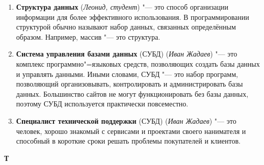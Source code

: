 \begin{enumerate}
     \item \textbf{Структура данных} (\textit{Леонид, студент}) "--- 
     это способ организации информации для более эффективного использования. В программировании структурой обычно называют набор данных, связанных определённым образом. Например, массив "--- это структура.

     \item \textbf{Система управления базами данных} (СУБД) (\textit{Иван Жадаев}) "--- 
     это комплекс программно"=языковых средств, позволяющих создать базы данных и управлять данными. Иными словами, СУБД "--- это набор программ, позволяющий организовывать, контролировать и администрировать базы данных. Большинство сайтов не могут функционировать без базы данных, поэтому СУБД используется практически повсеместно.

     \item \textbf{Специалист технической поддержки} (СУБД) (\textit{Иван Жадаев}) "--- 
     это человек, хорошо знакомый с сервисами и проектами своего нанимателя и способный в короткие сроки решать проблемы покупателей и клиентов. 
\end{enumerate}

\begin{flushleft} \large\textbf{Т} \end{flushleft}

